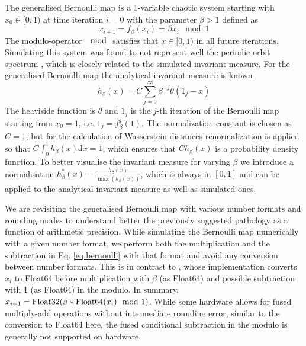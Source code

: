The generalised Bernoulli map \citep{Parry1960} is a 1-variable chaotic system starting with $x_0 \in [0,1)$
at time iteration $i=0$ with the parameter $\beta > 1$ defined as
\begin{equation}
	x_{i+1} = f_\beta(x_i) = \beta x_i \mod 1
	\label{eq:bernoulli}
\end{equation}
The modulo-operator $\mod$ satisfies that $x \in [0,1)$ in all future iterations. Simulating this system was found to not represent
well the periodic orbit spectrum \citep{Boghosian2019}, which is closely related to the simulated invariant measure. For the
generalised Bernoulli map the analytical invariant measure is known \citep{Hofbauer1978}
\begin{equation}
	h_\beta(x) = C\sum_{j=0}^\infty \beta^{-j} \theta(1_j - x)
	\label{eq:hofbauer}
\end{equation}
The heaviside function is $\theta$ and $1_j$ is the $j$-th iteration of the Bernoulli map starting from $x_0 = 1$, i.e. $1_j = f_\beta^j(1)$.
The normalization constant is chosen as $C=1$, but for the calculation of Wasserstein distances renormalization is applied so that
$C\int_0^1h_\beta(x) \mathrm{d}x = 1$, which ensures that $Ch_\beta(x)$ is a probability density function. To better visualise the
invariant measure for varying $\beta$ we introduce a normalisation $h_\beta^*(x) = \tfrac{h_\beta(x)}{\max(h_\beta(x))}$, which is always
in $[0,1]$ and can be applied to the analytical invariant measure as well as simulated ones.

We are revisiting the generalised Bernoulli map with various number formats and rounding modes to understand better the previously
suggested pathology \citep{Boghosian2019} as a function of arithmetic precision. While simulating the Bernoulli map numerically with
a given number format, we perform both the multiplication and the subtraction in Eq. \ref{eq:bernoulli} with that format and avoid any
conversion between number formats. This is in contrast to \cite{Boghosian2019}, whose implementation converts $x_i$ to Float64
before multiplication with $\beta$ (as Float64) and possible subtraction with 1 (as Float64) in the modulo. In summary, 
$x_{i+1} = \operatorname{Float32}(\beta * \operatorname{Float64}(x_i) \mod 1)$. While some hardware allows for fused multiply-add operations without
intermediate rounding error, similar to the conversion to Float64 here, the fused conditional subtraction in the modulo is generally not
supported on hardware.

